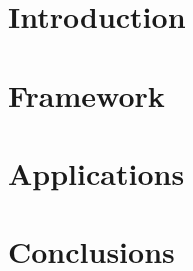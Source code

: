 \section[Intro]{Introduction}


\section[FRM]{Framework}


\section[App]{Applications}



\section[Concl]{Conclusions}
